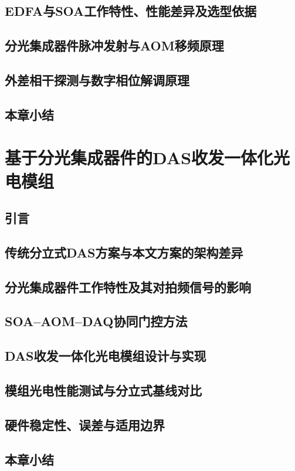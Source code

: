 \section{EDFA与SOA工作特性、性能差异及选型依据}
\section{分光集成器件脉冲发射与AOM移频原理}
\section{外差相干探测与数字相位解调原理}
\section{本章小结}

\chapter{基于分光集成器件的DAS收发一体化光电模组}
\thispagestyle{main}

\section{引言}
\section{传统分立式DAS方案与本文方案的架构差异}
\section{分光集成器件工作特性及其对拍频信号的影响}
\section{SOA--AOM--DAQ协同门控方法}
\section{DAS收发一体化光电模组设计与实现}
\section{模组光电性能测试与分立式基线对比}
\section{硬件稳定性、误差与适用边界}
\section{本章小结}

